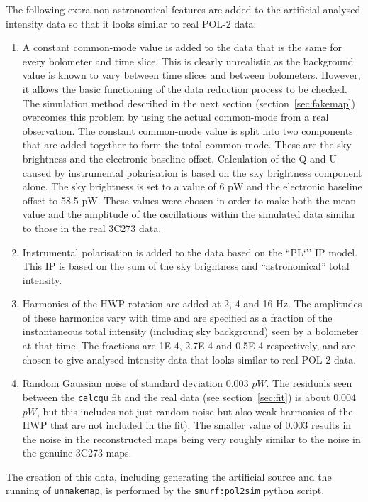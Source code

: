 \documentclass[twoside,11pt]{starlink}
\begin{document}
The following extra non-astronomical features are added to the artificial
analysed intensity data so that it looks similar to real POL-2 data:
\begin{enumerate}
\item A constant common-mode value is added to the data that is the same
for every bolometer and time slice. This is clearly unrealistic as the
background value is known to vary between time slices and between
bolometers. However, it allows the basic functioning of the data
reduction process to be checked. The simulation method described in the
next section (section~\ref{sec:fakemap}) overcomes this problem by using
the actual common-mode from a real observation. The constant common-mode
value is split into two components that are added together to form the
total common-mode. These are the sky brightness and the electronic
baseline offset. Calculation of the Q and U caused by instrumental
polarisation is based on the sky brightness component alone. The sky
brightness is set to a value of 6 pW and the electronic baseline offset
to 58.5 pW. These values were chosen in order to make both the mean value
and the amplitude of the oscillations within the simulated data similar to
those in the real 3C273 data.
\item Instrumental polarisation is added to the data based on the ``PL`'' IP
model. This IP is based on the sum of the sky brightness and ``astronomical''
total intensity.
\item Harmonics of the HWP rotation are added at 2, 4 and 16 Hz. The amplitudes
of these harmonics vary with time and are specified as a fraction of
the instantaneous total intensity (including sky background) seen by
a bolometer at that time. The fractions are 1E-4, 2.7E-4 and 0.5E-4
respectively, and are chosen to give analysed intensity data that looks
similar to real POL-2 data.
\item Random Gaussian noise of standard deviation 0.003 $pW$. The residuals
seen between the \texttt{calcqu} fit and the real data (see
section~\ref{sec:fit}) is about 0.004 $pW$, but this includes not just
random noise but also weak harmonics of the HWP that are not included in
the fit). The smaller value of 0.003 results in the noise in the
reconstructed maps being very roughly similar to the noise in the genuine 3C273
maps.
\end{enumerate}

The creation of this data, including generating the artificial source and
the running of \texttt{unmakemap}, is performed by the
\texttt{smurf:pol2sim} python script.
\end{document}
